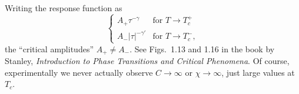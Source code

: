 Writing the response function as
\begin{equation}
  \begin{cases}
    A_+\tau^{-\gamma} & \text{for } T\to T_c^+\\
    A_-|\tau|^{-\gamma'} & \text{for } T\to T_c^-,
  \end{cases}
\end{equation}
the ``critical amplitudes'' $A_+\neq A_-$. See Figs.~1.13 and 1.16 in the book by
Stanley, \emph{Introduction to Phase Transitions and Critical Phenomena}. Of course,
experimentally we never actually observe $C\to\infty$ or $\chi\to\infty$, just large
values at $T_c$.

